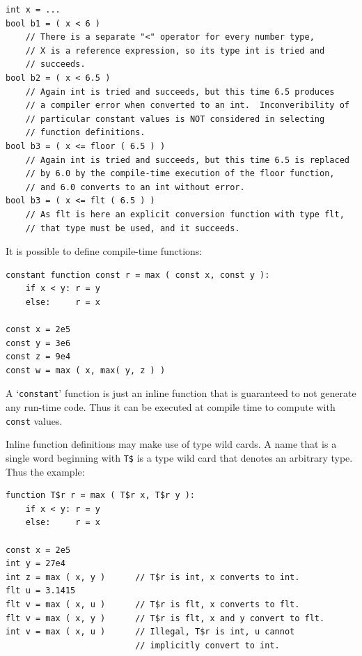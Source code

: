 \documentclass[12pt]{article}
\newenvironment{indpar}[1][0.3in]%
	{\begin{list}{}%
		     {\setlength{\itemsep}{0in}%
		      \setlength{\topsep}{0in}%
		      \setlength{\parsep}{1ex}%
		      \setlength{\labelwidth}{#1}%
		      \setlength{\leftmargin}{#1}%
		      \addtolength{\leftmargin}{\labelsep}}%
	 \item}%
	{\end{list}}
\begin{document}
\begin{indpar}\begin{verbatim}
int x = ...
bool b1 = ( x < 6 )
    // There is a separate "<" operator for every number type,
    // X is a reference expression, so its type int is tried and
    // succeeds.
bool b2 = ( x < 6.5 )
    // Again int is tried and succeeds, but this time 6.5 produces
    // a compiler error when converted to an int.  Inconveribility of
    // particular constant values is NOT considered in selecting
    // function definitions.
bool b3 = ( x <= floor ( 6.5 ) )
    // Again int is tried and succeeds, but this time 6.5 is replaced
    // by 6.0 by the compile-time execution of the floor function,
    // and 6.0 converts to an int without error.
bool b3 = ( x <= flt ( 6.5 ) )
    // As flt is here an explicit conversion function with type flt,
    // that type must be used, and it succeeds.
\end{verbatim}\end{indpar}

It is possible to define compile-time functions:

\begin{indpar}\begin{verbatim}
constant function const r = max ( const x, const y ):
    if x < y: r = y
    else:     r = x

const x = 2e5
const y = 3e6
const z = 9e4
const w = max ( x, max( y, z ) )
\end{verbatim}\end{indpar}

A `{\tt constant}' function is just an inline function that
is guaranteed to not generate any run-time code.
Thus it can be executed at compile time to compute with
{\tt const} values.

Inline function definitions may make use of type wild cards.
A name that is a single word beginning with {\tt T\$}
is a type wild card that denotes
an arbitrary type.  Thus the example:

\begin{indpar}\begin{verbatim}
function T$r r = max ( T$r x, T$r y ):
    if x < y: r = y
    else:     r = x

const x = 2e5
int y = 27e4
int z = max ( x, y )      // T$r is int, x converts to int.
flt u = 3.1415
flt v = max ( x, u )      // T$r is flt, x converts to flt.
flt v = max ( x, y )      // T$r is flt, x and y convert to flt.
int v = max ( x, u )      // Illegal, T$r is int, u cannot
                          // implicitly convert to int.
\end{verbatim}\end{indpar}
\end{document}
